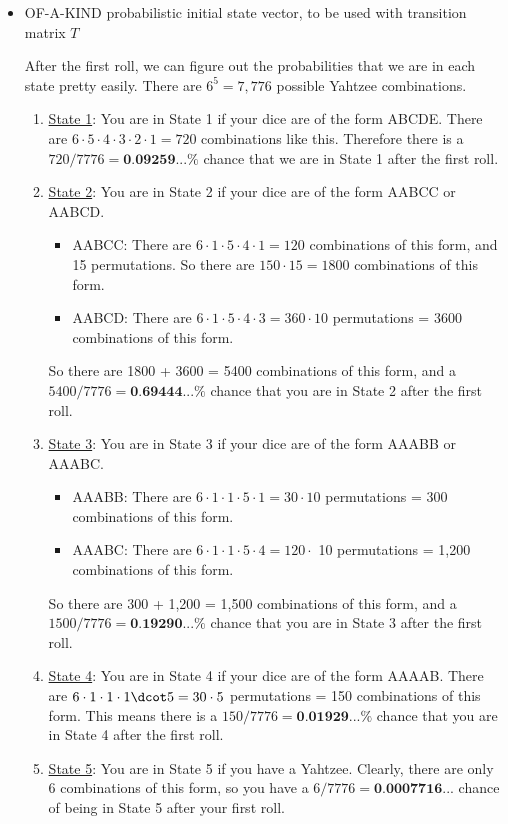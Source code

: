 \documentclass[12pt,a4paper]{article}
\begin{document}
\begin{itemize}
    \item OF-A-KIND probabilistic initial state vector, to be used with transition matrix $T$

    After the first roll, we can figure out the probabilities that we are in each state pretty easily. There are $6^5 = 7,776$ possible Yahtzee combinations.

\begin{enumerate}
    \item \underline{State 1}: You are in State 1 if your dice are of the form ABCDE. There are $6 \cdot 5 \cdot 4 \cdot 3 \cdot 2 \cdot 1 = 720$  combinations like this. Therefore there is a $720/7776 = \textbf{0.09259...\%}$ chance that we are in State 1 after the first roll.
    \item \underline{State 2}: You are in State 2 if your dice are of the form AABCC or AABCD.
    \begin{itemize}
        \item AABCC: There are $6 \cdot 1 \cdot 5 \cdot 4 \cdot 1 = 120$ combinations of this form, and 15 permutations. So there are $150 \cdot 15 = 1800$ combinations of this form.
        \item AABCD: There are $6 \cdot 1 \cdot 5 \cdot 4 \cdot 3 = 360 \cdot 10$ permutations = 3600 combinations of this form.
    \end{itemize}
    So there are 1800 + 3600 = 5400 combinations of this form, and a $5400/7776 = \textbf{0.69444...\%}$ chance that you are in State 2 after the first roll.
    \item \underline{State 3}: You are in State 3 if your dice are of the form AAABB or AAABC.
    \begin{itemize}
        \item AAABB: There are $6 \cdot 1 \cdot 1 \cdot 5 \cdot 1 = 30 \cdot 10$ permutations = 300 combinations of this form.
        \item AAABC: There are $6 \cdot 1 \cdot 1 \cdot 5 \cdot 4 = 120 \cdot$ 10 permutations = 1,200 combinations of this form.
    \end{itemize}
    So there are 300 + 1,200 = 1,500 combinations of this form, and a $1500/7776 = \textbf{0.19290...\%}$ chance that you are in State 3 after the first roll.
    \item \underline{State 4}: You are in State 4 if your dice are of the form AAAAB. There are $6 \cdot 1 \cdot 1 \cdot 1 \dcot 5 = 30 \cdot 5$ permutations = 150 combinations of this form. This means there is a $150/7776 = \textbf{0.01929...\%}$ chance that you are in State 4 after the first roll.
    \item \underline{State 5}: You are in State 5 if you have a Yahtzee. Clearly, there are only 6 combinations of this form, so you have a $6/7776 = \textbf{0.0007716...}$ chance of being in State 5 after your first roll.
\end{enumerate}


\end{itemize}
\end{document}
